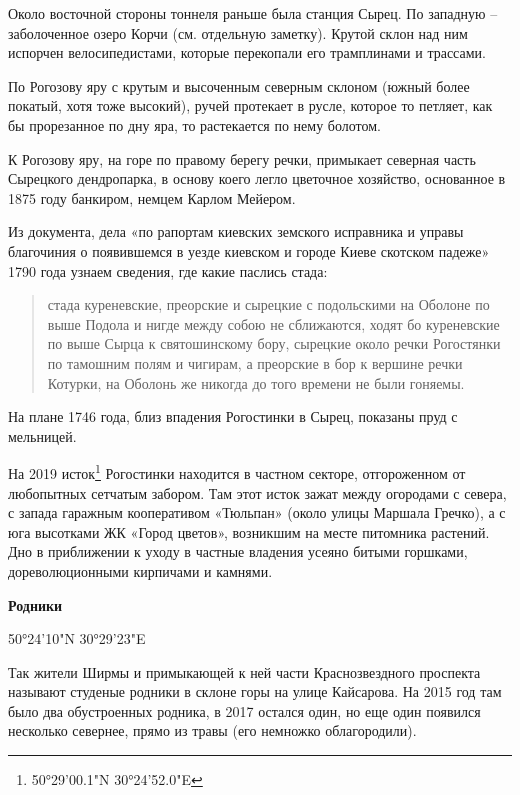 Около восточной стороны тоннеля раньше была станция Сырец. По западную – заболоченное озеро Корчи (см. отдельную заметку). Крутой склон над ним испорчен велосипедистами, которые перекопали его трамплинами и трассами.

По Рогозову яру с крутым и высоченным северным склоном (южный более покатый, хотя тоже высокий), ручей протекает в русле, которое то петляет, как бы прорезанное по дну яра, то растекается по нему болотом.

К Рогозову яру, на горе по правому берегу речки, примыкает северная часть Сырецкого дендропарка, в основу коего легло цветочное хозяйство, основанное в 1875 году банкиром, немцем Карлом Мейером.

Из документа, дела «по рапортам киевских земского исправника и управы благочиния о появившемся в уезде киевском и городе Киеве скотском падеже» 1790 года узнаем сведения, где какие паслись стада:

\begin{quotation}
стада куреневские, преорские и сырецкие с подольскими на Оболоне по выше Подола и нигде между собою не сближаются, ходят бо куреневские по выше Сырца к святошинскому бору, сырецкие около речки Рогостянки по тамошним полям и чигирам, а преорские в бор к вершине речки Котурки, на Оболонь же никогда до того времени не были гоняемы.
\end{quotation}

На плане 1746 года, близ впадения Рогостинки в Сырец, показаны пруд с мельницей.

На 2019 исток\footnote{50°29'00.1"N 30°24'52.0"E} Рогостинки находится в частном секторе, отгороженном от любопытных сетчатым забором. Там этот исток зажат между огородами с севера, с запада гаражным кооперативом «Тюльпан» (около улицы Маршала Гречко), а с юга высотками ЖК «Город цветов», возникшим на месте питомника растений. Дно в приближении к уходу в частные владения усеяно битыми горшками, дореволюционными кирпичами и камнями.\\ 

\newpage

\textbf{Родники}

50°24'10"N 30°29'23"E

Так жители Ширмы и примыкающей к ней части Краснозвездного проспекта называют студеные родники в склоне горы на улице Кайсарова. На 2015 год там было два обустроенных родника, в 2017 остался один, но еще один появился несколько севернее, прямо из травы (его немножко облагородили).\\

